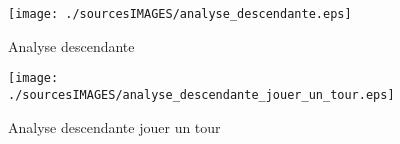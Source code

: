 \begin{figure}[ht]
  \centering
  \texttt{[image: ./sourcesIMAGES/analyse\_descendante.eps]}
  \caption{Analyse descendante}
  \texttt{[image: ./sourcesIMAGES/analyse\_descendante\_jouer\_un\_tour.eps]}

  \caption{Analyse descendante jouer un tour}
\end{figure}
